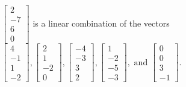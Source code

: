 \begin{exercise}
\begin{exerciseStatement}
  \end{exerciseStatement}
  \begin{exerciseAnswer}
   \(\left[\begin{array}{c}
2 \\
-7 \\
6 \\
0
\end{array}\right]\) 
  	 is  
	a linear combination of the vectors \(\left[\begin{array}{c}
4 \\
-1 \\
1 \\
-2
\end{array}\right] , \left[\begin{array}{c}
2 \\
1 \\
-2 \\
0
\end{array}\right] , \left[\begin{array}{c}
-4 \\
-3 \\
3 \\
2
\end{array}\right] , \left[\begin{array}{c}
1 \\
-2 \\
-5 \\
-3
\end{array}\right] , \text{ and } \left[\begin{array}{c}
0 \\
0 \\
3 \\
-1
\end{array}\right]\).

	
  


  \end{exerciseAnswer}
\end{exercise}